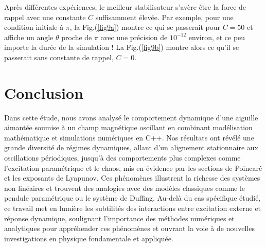 \documentclass[a4paper,12pt,twoside]{article}
\begin{document}
Après différentes expériences, le meilleur stabilisateur s'avère être la force de rappel avec une constante $C$ suffisamment élevée. Par exemple, pour une condition initiale à $\pi$, la Fig.(\ref{fig9a}) montre ce qui se passerait pour $C=50$ et affiche un angle $\theta$ proche de $\pi$ avec une précision de $10^{-12}$ environ, et ce peu importe la durée de la simulation ! La Fig.(\ref{fig9b}) montre alors ce qu'il se passerait sans constante de rappel,  $C=0$.




\section{Conclusion}

Dans cette étude, nous avons analysé le comportement dynamique d’une aiguille aimantée soumise à un champ magnétique oscillant en combinant modélisation mathématique et simulations numériques en C++. Nos résultats ont révélé une grande diversité de régimes dynamiques, allant d’un alignement stationnaire aux oscillations périodiques, jusqu’à des comportements plus complexes comme l’excitation paramétrique et le chaos, mis en évidence par les sections de Poincaré et les exposants de Lyapunov. Ces phénomènes illustrent la richesse des systèmes non linéaires et trouvent des analogies avec des modèles classiques comme le pendule paramétrique ou le système de Duffing. Au-delà du cas spécifique étudié, ce travail met en lumière les subtilités des interactions entre excitation externe et réponse dynamique, soulignant l’importance des méthodes numériques et analytiques pour appréhender ces phénomènes et ouvrant la voie à de nouvelles investigations en physique fondamentale et appliquée.
\end{document}

